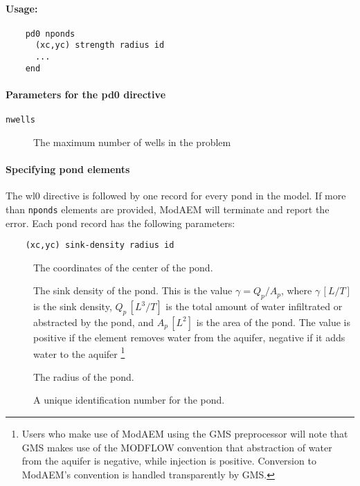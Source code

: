 \paragraph{Usage:}
\begin{verbatim}
    pd0 nponds
      (xc,yc) strength radius id 
      ... 
    end
\end{verbatim}

\paragraph{Parameters for the \textsf{pd0} directive}
\begin{description}
\item [{\texttt{nwells}}] The maximum number of wells in the problem 
\end{description}

\paragraph{Specifying pond elements}
The \textsf{wl0} directive is followed by one record for every pond
in the model. If more than \texttt{nponds} elements are provided, ModAEM
will terminate and report the error. Each pond record has the following
parameters:
\begin{verbatim}
    (xc,yc) sink-density radius id\end{verbatim}
\begin{description}
  \item [] The coordinates of the center of the pond. 
  \item [] The sink density of the pond. This is the
    value $\gamma=Q_{p}/A_{p}$, where $\gamma\,[L/T]$ is the sink density,
    $Q_{p}\,[L^{3}/T]$ is the total amount of water infiltrated or abstracted
    by the pond, and $A_{p}\,[L^{2}]$ is the area of the pond. The value
    is positive if the element removes water from the aquifer, negative
    if it adds water to the aquifer 
      \footnote{Users who make use of ModAEM using the GMS preprocessor will note
        that GMS makes use of the MODFLOW convention that abstraction of water
        from the aquifer is negative, while injection is positive. Conversion
        to ModAEM's convention is handled transparently by GMS.}
  \item [] The radius of the pond. 
  \item [] A unique identification number for the pond. \units{-}
\end{description}
\newpage

